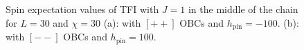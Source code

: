 	\begin{figure}[h!]
		\hspace{-0.9cm}
		\quad
		\caption{Spin expectation values of TFI with $J=1$ in the middle of the chain for $L=30$ and $\chi=30$ (a): with $[++]$ OBCs and $h_\text{pin}=-100$. (b): with $[--]$ OBCs and $h_\text{pin}=100$.}
		\label{fig:spinTFI}
	\end{figure}

